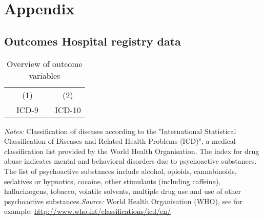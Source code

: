 \documentclass{scrartcl} %
\begin{document}
\newpage
\section{Appendix}
\subsection{Outcomes Hospital registry data}


\begin{table}[h] %
\begin{threeparttable}
\centering %
\caption{Overview of outcome variables} %
\label{tab:outcomes_coding_main_chapters} 
\begin{tabular}{lrrr} %
\toprule %
        &\multicolumn{1}{c}{(1)}& &\multicolumn{1}{c}{(2)}\\
&\multicolumn{1}{c}{ICD-9} & & \multicolumn{1}{c}{ICD-10} \\ 
\midrule

\bottomrule %
\end{tabular}
\begin{tablenotes}
      \scriptsize{ \item \textit{Notes:} Classification of diseases according to the "International Statistical Classification of Diseases and Related Health Problems (ICD)", a medical classification list provided by the World Health Organisation. The index for drug abuse indicates mental and behavioral disorders due to psychoactive substances. The list of psychoactive substances include alcohol, opioids, cannabinoids, sedatives or hypnotics, cocaine, other stimulants (including caffeine), hallucinogens, tobacco, volatile solvents,  multiple drug use and use of other psychoactive substances.\newline \textit{Source:} World Health Organisation (WHO), see for example: \href{http://www.who.int/classifications/icd/en/}{http://www.who.int/classifications/icd/en/} }
    \end{tablenotes}
  \end{threeparttable}
\end{table}
\end{document}
